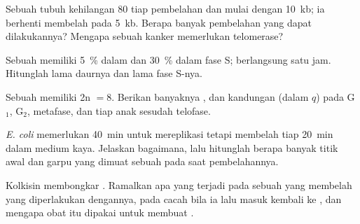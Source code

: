 \begin{exercise}[$\star\star$]\label{exo:b1:replication-mitosis:7}
Sebuah  tubuh kehilangan \qty{80}{}   tiap
pembelahan dan mulai dengan \qty{10}{kb}; ia berhenti membelah pada
\qty{5}{kb}. Berapa banyak pembelahan yang dapat dilakukannya? Mengapa
sebuah  kanker memerlukan telomerase?
\end{exercise}

\begin{exercise}[$\star\star$]\label{exo:b1:replication-mitosis:8}
Sebuah  memiliki \qty{5}{\%}  dalam  dan
\qty{30}{\%} dalam fase S;  berlangsung satu jam. Hitunglah
lama daurnya dan lama fase S-nya.
\end{exercise}

\begin{exercise}[$\star\star$]\label{exo:b1:replication-mitosis:9}
Sebuah  memiliki 2n $= 8$. Berikan banyaknya ,  dan
kandungan  (dalam $q$) pada G$_1$, G$_2$, metafase, dan tiap 
anak sesudah telofase.
\end{exercise}

\begin{exercise}[$\star\star\star$]\label{exo:b1:replication-mitosis:10}
\emph{E. coli} memerlukan \qty{40}{min} untuk mereplikasi 
tetapi membelah tiap \qty{20}{min} dalam medium kaya. Jelaskan
bagaimana, lalu hitunglah berapa banyak titik awal dan garpu yang dimuat
sebuah  pada saat pembelahannya.
\end{exercise}

\begin{exercise}[$\star\star\star$]\label{exo:b1:replication-mitosis:11}
Kolkisin membongkar . Ramalkan apa yang terjadi pada sebuah
 yang membelah yang diperlakukan dengannya, pada cacah 
bila ia lalu masuk kembali ke , dan mengapa obat itu dipakai
untuk membuat .
\end{exercise}

